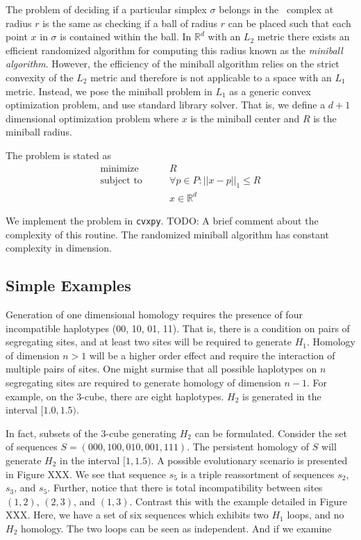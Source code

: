 The problem of deciding if a particular simplex $\sigma$ belongs in the \Cech\ complex at radius $r$ is the same as checking if a ball of radius $r$ can be placed such that each point $x$ in $\sigma$ is contained within the ball.
In $\mathbb{R}^d$ with an $L_2$ metric there exists an efficient randomized algorithm for computing this radius known as the \emph{miniball algorithm}.\autocite{Gartner:1999}
However, the efficiency of the miniball algorithm relies on the strict convexity of the $L_2$ metric and therefore is not applicable to a space with an $L_1$ metric.
Instead, we pose the miniball problem in $L_1$ as a generic convex optimization problem, and use standard library solver.
That is, we define a $d+1$ dimensional optimization problem where $x$ is the miniball center and $R$ is the miniball radius.

The problem is stated as
\begin{align*}
\text{minimize}\qquad   &  R \\
\text{subject to}\qquad & \forall p \in P: ||x-p||_{1} \leq R \\
                        & x \in \mathbb{R}^d
\end{align*}

We implement the problem in \texttt{cvxpy}.
TODO: A brief comment about the complexity of this routine.
The randomized miniball algorithm has constant complexity in dimension.

\subsection{Simple Examples}
\label{subsec:higher_dim_examples}
%
Generation of one dimensional homology requires the presence of four incompatible haplotypes (00, 10, 01, 11).
That is, there is a condition on pairs of segregating sites, and at least two sites will be required to generate $H_1$.
Homology of dimension $n>1$ will be a higher order effect and require the interaction of multiple pairs of sites.
One might surmise that all possible haplotypes on $n$ segregating sites are required to generate homology of dimension $n-1$.
For example, on the 3-cube, there are eight haplotypes.
$H_2$ is generated in the interval $[1.0,1.5)$.

In fact, subsets of the 3-cube generating $H_2$ can be formulated.
Consider the set of sequences $S=(000,100,010,001,111)$.
The persistent homology of $S$ will generate $H_2$ in the interval $[1,1.5)$.
A possible evolutionary scenario is presented in Figure XXX.
We see that sequence $s_5$ is a triple reassortment of sequences $s_2$, $s_3$, and $s_5$.
Further, notice that there is total incompatibility between sites $(1,2)$, $(2,3)$, and $(1,3)$.
Contrast this with the example detailed in Figure XXX.
Here, we have a set of six sequences which exhibits two $H_1$ loops, and no $H_2$ homology.
The two loops can be seen as independent.
And if we examine

